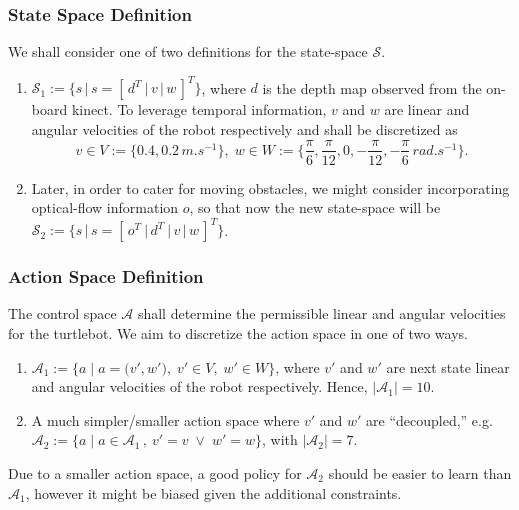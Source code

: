 \documentclass{article}
\begin{document}
\subsubsection{State Space Definition}
We shall consider one of two definitions for the state-space $\mathcal{S}$.
\begin{enumerate}
    \item $\mathcal{S}_1 := \big\{ s\,\big\vert \, s= [\,d^T\:\vert\,v\,\vert\,w\,]^T \big\}$, where $d$ is the depth map observed from the on-board kinect. To leverage temporal information, $v$ and $w$ are linear and angular velocities of the robot respectively and shall be discretized as
    \begin{equation*}
      v\in V := \big\{ 0.4, 0.2\,\si{m.s^{-1}}\big\}, \;w\in W:=\big\{ \frac{\pi}{6}, \frac{\pi}{12}, 0, -\frac{\pi}{12}, -\frac{\pi}{6}\,\si{rad.s^{-1}}\big\}.
    \end{equation*}
    \item Later, in order to cater for moving obstacles, we might consider incorporating optical-flow information $o$, so that now the new state-space will be $\mathcal{S}_2 := \big\{ s\,\big\vert \, s = [\,o^T\:\vert\,d^T\:\vert\,v\,\vert\,w\,]^T \big\}$.
\end{enumerate}

\subsubsection{Action Space Definition}
The control space $\mathcal{A}$ shall determine the permissible linear and angular velocities for the turtlebot. We aim to discretize the action space in one of two ways.
\begin{enumerate}
    \item $\mathcal{A}_1 := \Big\{ a \;\Big\vert\; a = \big(v', w'\big), \;v'\in V, \;w'\in W \Big\}$, where $v'$ and $w'$ are next state linear and angular velocities of the robot respectively. Hence, $\vert \mathcal{A}_1 \vert = 10$.
    \item A much simpler/smaller action space where $v'$ and $w'$ are ``decoupled,'' e.g. $\mathcal{A}_2 := \big\{ a\; \big\vert \;a \in \mathcal{A}_1\,,\: v' = v \;\lor\; w' = w \big\}$, with $\vert \mathcal{A}_2 \vert = 7$.
\end{enumerate}
Due to a smaller action space, a good policy for $\mathcal{A}_2$ should be easier to learn than $\mathcal{A}_1$, however it might be biased given the additional constraints.
\end{document}
